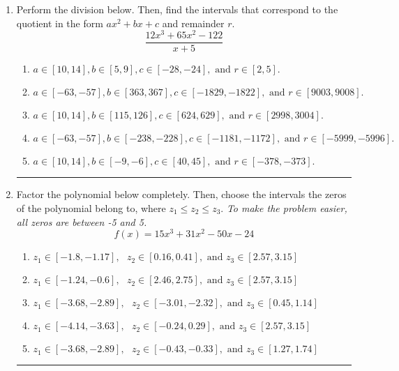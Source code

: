 \documentclass[14pt]{extbook}
\newcommand{\litem}[1]{\item#1\hspace*{-1cm}\rule{\textwidth}{0.4pt}}
\begin{document}
\begin{enumerate}
{\begin{enumerate}[label=\Alph*.]
\end{enumerate} }
\litem{
Perform the division below. Then, find the intervals that correspond to the quotient in the form $ax^2+bx+c$ and remainder $r$.\[ \frac{12x^{3} +65 x^{2} -122}{x + 5} \]\begin{enumerate}[label=\Alph*.]
\item \( a \in [10, 14], b \in [5, 9], c \in [-28, -24], \text{ and } r \in [2, 5]. \)
\item \( a \in [-63, -57], b \in [363, 367], c \in [-1829, -1822], \text{ and } r \in [9003, 9008]. \)
\item \( a \in [10, 14], b \in [115, 126], c \in [624, 629], \text{ and } r \in [2998, 3004]. \)
\item \( a \in [-63, -57], b \in [-238, -228], c \in [-1181, -1172], \text{ and } r \in [-5999, -5996]. \)
\item \( a \in [10, 14], b \in [-9, -6], c \in [40, 45], \text{ and } r \in [-378, -373]. \)

\end{enumerate} }
\litem{
Factor the polynomial below completely. Then, choose the intervals the zeros of the polynomial belong to, where $z_1 \leq z_2 \leq z_3$. \textit{To make the problem easier, all zeros are between -5 and 5.}\[ f(x) = 15x^{3} +31 x^{2} -50 x -24 \]\begin{enumerate}[label=\Alph*.]
\item \( z_1 \in [-1.8, -1.17], \text{   }  z_2 \in [0.16, 0.41], \text{   and   } z_3 \in [2.57, 3.15] \)
\item \( z_1 \in [-1.24, -0.6], \text{   }  z_2 \in [2.46, 2.75], \text{   and   } z_3 \in [2.57, 3.15] \)
\item \( z_1 \in [-3.68, -2.89], \text{   }  z_2 \in [-3.01, -2.32], \text{   and   } z_3 \in [0.45, 1.14] \)
\item \( z_1 \in [-4.14, -3.63], \text{   }  z_2 \in [-0.24, 0.29], \text{   and   } z_3 \in [2.57, 3.15] \)
\item \( z_1 \in [-3.68, -2.89], \text{   }  z_2 \in [-0.43, -0.33], \text{   and   } z_3 \in [1.27, 1.74] \)


\end{enumerate}}
\end{enumerate}
\end{document}
